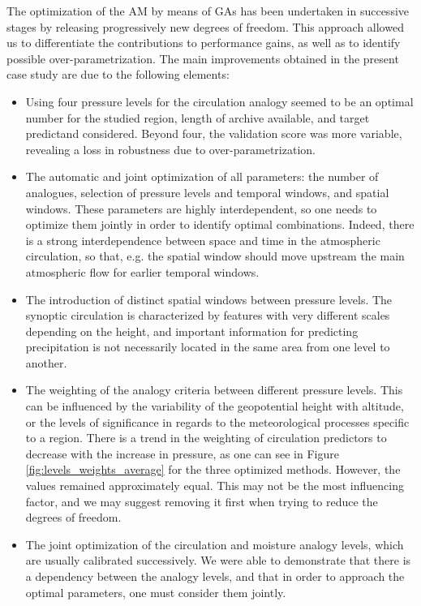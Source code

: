 \documentclass[review]{elsarticle}
\begin{document}
The optimization of the AM by means of GAs has been undertaken in successive stages by releasing progressively new degrees of freedom. This approach allowed us to differentiate the contributions to performance gains, as well as to identify possible over-parametrization. The main improvements obtained in the present case study are due to the following elements:

\begin{itemize}
	\item Using four pressure levels for the circulation analogy seemed to be an optimal number for the studied region, length of archive available, and target predictand considered. Beyond four, the validation score was more variable, revealing a loss in robustness due to over-parametrization.
	\item The automatic and joint optimization of all parameters: the number of analogues, selection of pressure levels and temporal windows, and spatial windows. These parameters are highly interdependent, so one needs to optimize them jointly in order to identify optimal combinations. Indeed, there is a strong interdependence between space and time in the atmospheric circulation, so that, e.g. the spatial window should move upstream the main atmospheric flow for earlier temporal windows.
	\item The introduction of distinct spatial windows between pressure levels. The synoptic circulation is characterized by features with very different scales depending on the height, and important information for predicting precipitation is not necessarily located in the same area from one level to another.
	\item The weighting of the analogy criteria between different pressure levels. This can be influenced by the variability of the geopotential height with altitude, or the levels of significance in regards to the meteorological processes specific to a region. There is a trend in the weighting of circulation predictors to decrease with the increase in pressure, as one can see in Figure \ref{fig:levels_weights_average} for the three optimized methods. However, the values remained approximately equal. This may not be the most influencing factor, and we may suggest removing it first when trying to reduce the degrees of freedom.
	\item The joint optimization of the circulation and moisture analogy levels, which are usually calibrated successively. We were able to demonstrate that there is a dependency between the analogy levels, and that in order to approach the optimal parameters, one must consider them jointly.
\end{itemize}
\end{document}
